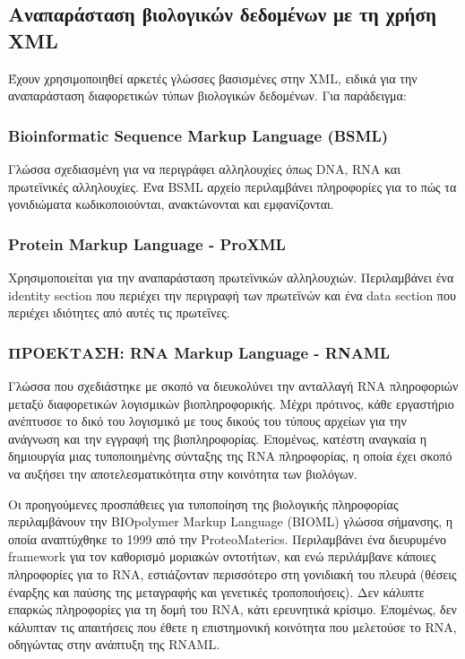     \subsection{Αναπαράσταση βιολογικών δεδομένων με τη χρήση XML}
        Έχουν χρησιμοποιηθεί αρκετές γλώσσες βασισμένες στην XML, ειδικά για την αναπαράσταση διαφορετικών τύπων βιολογικών δεδομένων. Για παράδειγμα:

        \subsubsection{Bioinformatic Sequence Markup Language (BSML)}
            Γλώσσα σχεδιασμένη για να περιγράφει αλληλουχίες όπως DNA, RNA και πρωτεϊνικές αλληλουχίες.
            Ένα BSML αρχείο περιλαμβάνει πληροφορίες για το πώς τα γονιδιώματα κωδικοποιούνται, ανακτώνονται και εμφανίζονται.

        \subsubsection{Protein Markup Language - ProXML}
            Χρησιμοποιείται για την αναπαράσταση πρωτεϊνικών αλληλουχιών.
            Περιλαμβάνει ένα identity section που περιέχει την περιγραφή των πρωτεϊνών και ένα data section που περιέχει ιδιότητες από αυτές τις πρωτεΐνες.

        \subsubsection{ΠΡΟΕΚΤΑΣΗ: RNA Markup Language - RNAML}
            Γλώσσα που σχεδιάστηκε με σκοπό να διευκολύνει την ανταλλαγή RNA πληροφοριών μεταξύ διαφορετικών λογισμικών βιοπληροφορικής. \cite{RNAML}
            Μέχρι πρότινος, κάθε εργαστήριο ανέπτυσσε το δικό του λογισμικό με τους δικούς του τύπους αρχείων για την ανάγνωση και την εγγραφή της βιοπληροφορίας.
            Επομένως, κατέστη αναγκαία η δημιουργία μιας τυποποιημένης σύνταξης της RNA πληροφορίας, η οποία έχει σκοπό να αυξήσει την αποτελεσματικότητα στην κοινότητα των βιολόγων.

            Οι προηγούμενες προσπάθειες για τυποποίηση της βιολογικής πληροφορίας περιλαμβάνουν την BIOpolymer Markup Language (BIOML) γλώσσα σήμανσης, η οποία αναπτύχθηκε το 1999 από την ProteoMaterics.
            Περιλαμβάνει ένα διευρυμένο framework για τον καθορισμό μοριακών οντοτήτων, και ενώ περιλάμβανε κάποιες πληροφορίες για το RNA, εστιάζονταν περισσότερο στη γονιδιακή του πλευρά (θέσεις έναρξης και παύσης της μεταγραφής και γενετικές τροποποιήσεις).
            Δεν κάλυπτε επαρκώς πληροφορίες για τη δομή του RNA, κάτι ερευνητικά κρίσιμο.
            Επομένως, δεν κάλυπταν τις απαιτήσεις που έθετε η επιστημονική κοινότητα που μελετούσε το RNA, οδηγώντας στην ανάπτυξη της RNAML.

